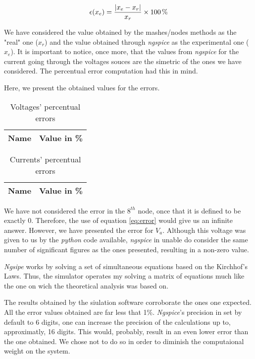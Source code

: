 \begin{equation}
  \centering
  \epsilon (x_e)=\frac{|x_e-x_r|}{x_r} \times 100\,\%
  \label{eq:error}
\end{equation}

We have considered the value obtained by the mashes/nodes methods as the "real" one ($x_r$) and the value obtained through \emph{ngspice} as the experimental one ($x_e$). It is important to notice, once more, that the values from \emph{ngspice} for the current going through the voltages souces are the simetric of the ones we have considered. The percentual error computation had this in mind.

Here, we present the obtained values for the errors.

\begin{table}[H]
  \centering
  \begin{tabular}{|l|r|}
    \hline
    {\bf Name} & {\bf Value in \%} \\ \hline
    
  \end{tabular}
  \caption{Voltages' percentual errors}
  \label{tab:op}
\end{table}



\begin{table}[H]
  \centering
  \begin{tabular}{|l|r|}
    \hline
    {\bf Name} & {\bf Value in \%} \\ \hline
    
  \end{tabular}
  \caption{Currents' percentual errors }
  \label{tab:op}
\end{table}

We have not considered the error in the $8^{th}$ node, once that it is defined to be exactly 0. Therefore, the use of equation \ref{eq:error} would give us an infinite answer. However, we have presented the error for $V_a$. Although this voltage was given to us by the \emph{python} code available, \emph{ngspice} in unable do consider the same number of significant figures as the ones presented, resulting in a non-zero value.


\emph{Ngsipe} works by solving a set of simultaneous equations based on the Kirchhof's Laws. Thus, the simulator operates my solving a matrix of equations much like the one on wich the theoretical analysis was based on.

The results obtained by the siulation software corroborate the ones one expected. All the error values obtained are far less that 1\%. \emph{Ngspice}'s precision in set by default to 6 digits, one can increase the precision of the calculations up to, approximatly, 16 digits. This would, probably, result in an even lower error than the one obtained. We chose not to do so in order to diminish the computaional weight on the system.

